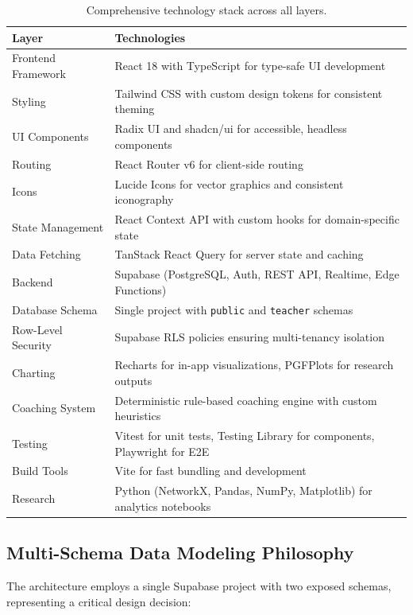 \documentclass[sigconf,authordraft,twoside]{acmart}
\newcommand{\tech}[1]{\textcolor{brandblue}{\nolinkurl{#1}}}
\begin{document}
\begin{table}[t]
\centering
\small
\begin{tabularx}{\textwidth}{>{\raggedright\arraybackslash}p{} X}
\toprule
\textbf{Layer} & \textbf{Technologies} \\
\midrule
Frontend Framework & React 18 with TypeScript for type-safe UI development \\
Styling & Tailwind CSS with custom design tokens for consistent theming \\
UI Components & Radix UI and shadcn/ui for accessible, headless components \\
Routing & React Router v6 for client-side routing \\
Icons & Lucide Icons for vector graphics and consistent iconography \\
State Management & React Context API with custom hooks for domain-specific state \\
Data Fetching & TanStack React Query for server state and caching \\
Backend & Supabase (PostgreSQL, Auth, REST API, Realtime, Edge Functions) \\
Database Schema & Single project with \tech{public} and \tech{teacher} schemas \\
Row-Level Security & Supabase RLS policies ensuring multi-tenancy isolation \\
Charting & Recharts for in-app visualizations, PGFPlots for research outputs \\
Coaching System & Deterministic rule-based coaching engine with custom heuristics \\
Testing & Vitest for unit tests, Testing Library for components, Playwright for E2E \\
Build Tools & Vite for fast bundling and development \\
Research & Python (NetworkX, Pandas, NumPy, Matplotlib) for analytics notebooks \\
\bottomrule
\end{tabularx}
\caption{Comprehensive technology stack across all layers.}
\end{table}

\subsection{Multi-Schema Data Modeling Philosophy}
The architecture employs a single Supabase project with two exposed schemas, representing a critical design decision:
\end{document}
